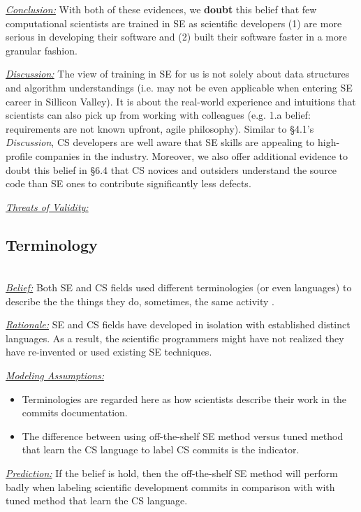 \documentclass[sigconf,review,anonymous]{acmart}
\newcommand{\bi}{\begin{itemize}}
\newcommand{\ei}{\end{itemize}}
\newenvironment{RQ}{\vspace{1mm}\begin{tcolorbox}[enhanced,width=3.4in,size=fbox,colback=red!5!white,drop shadow southwest,sharp corners]}{\end{tcolorbox}}
\begin{document}
\begin{RQ}
 \textit{\underline{Conclusion:}} With both of these evidences, we \textbf{doubt} this belief that few computational scientists are trained in SE as scientific developers (1) are more serious in developing their software and (2) built their software faster in a more granular fashion.
\end{RQ}

\noindent \textit{\underline{Discussion:}} The view of training in SE for us is not solely about data structures and algorithm understandings (i.e. may not be even applicable when entering SE career in Sillicon Valley). It is about the real-world experience and intuitions that scientists can also pick up from working with colleagues (e.g. 1.a belief: requirements are not known upfront, agile philosophy). Similar to \S4.1's \textit{Discussion}, CS developers are well aware that SE skills are appealing to high-profile companies in the industry.  Moreover, we also offer additional evidence to doubt this belief in \S6.4 that CS novices and outsiders understand the source code than SE ones to contribute significantly less defects.  

\noindent \textit{\underline{Threats of Validity:}} 

\subsection{Terminology}~\\
\noindent \textit{\underline{Belief:}} Both SE and CS fields used different terminologies (or even languages) to describe the the things they do, sometimes, the same activity \cite{faulk09_secs, easterbrook_cs, boyle09_lessons}.

\noindent \textit{\underline{Rationale:}} SE and CS fields have developed in isolation with established distinct languages. As a result, the scientific programmers might have not realized they have re-invented or used existing SE techniques.

\noindent \textit{\underline{Modeling Assumptions:}} 
\bi
\item Terminologies are regarded here as how scientists describe their work in the commits documentation. 
\item The difference between using off-the-shelf SE method versus tuned method that learn the CS language to label CS commits is the indicator.
\ei

\noindent \textit{\underline{Prediction:}} If the belief is hold, then the off-the-shelf SE method will perform badly when labeling scientific development commits in comparison with with tuned method that learn the CS language.  
\end{document}
